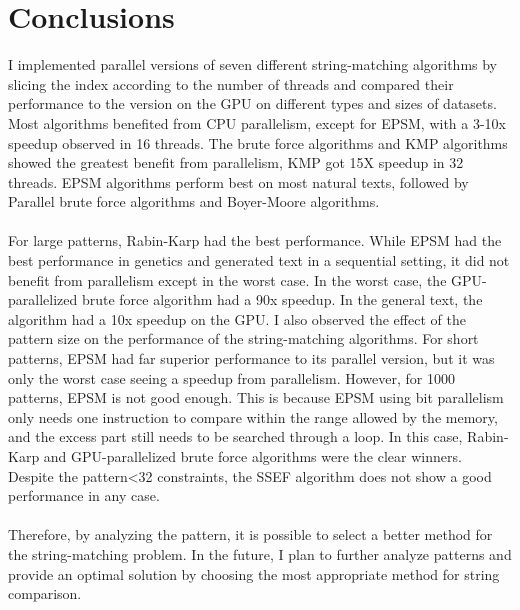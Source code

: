 \documentclass[11pt]{article}       %
\begin{document}
\section{Conclusions} \label{concl}
I implemented parallel versions of seven different string-matching algorithms by slicing the index according to the number of threads and compared their performance to the version on the GPU on different types and sizes of datasets. Most algorithms benefited from CPU parallelism, except for EPSM, with a 3-10x speedup observed in 16 threads. The brute force algorithms and KMP algorithms showed the greatest benefit from parallelism, KMP got 15X speedup in 32 threads. EPSM algorithms perform best on most natural texts, followed by Parallel brute force algorithms and Boyer-Moore algorithms.\\
\\ For large patterns, Rabin-Karp had the best performance. While EPSM had the best performance in genetics and generated text in a sequential setting, it did not benefit from parallelism except in the worst case. In the worst case, the GPU-parallelized brute force algorithm had a 90x speedup. In the general text, the algorithm had a 10x speedup on the GPU. I also observed the effect of the pattern size on the performance of the string-matching algorithms. For short patterns, EPSM had far superior performance to its parallel version, but it was only the worst case seeing a speedup from parallelism. However, for 1000 patterns, EPSM is not good enough. This is because EPSM using bit parallelism only needs one instruction to compare within the range allowed by the memory, and the excess part still needs to be searched through a loop. In this case, Rabin-Karp and GPU-parallelized brute force algorithms were the clear winners. Despite the pattern<32 constraints, the SSEF algorithm does not show a good performance in any case.\\
\\Therefore, by analyzing the pattern, it is possible to select a better method for the string-matching problem. In the future, I plan to further analyze patterns and provide an optimal solution by choosing the most appropriate method for string comparison.
\end{document}
